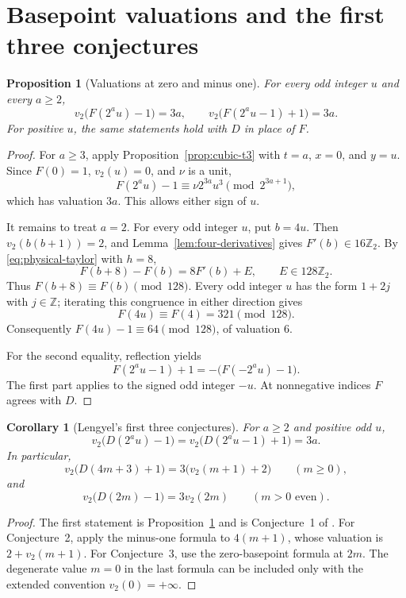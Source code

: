 \documentclass[11pt]{article}
\newtheorem{proposition}[theorem]{Proposition}
\newtheorem{corollary}[theorem]{Corollary}
\theoremstyle{remark}\newtheorem{remark}[theorem]{Remark}
\newcommand{\Z}{\mathbb Z}\newcommand{\Q}{\mathbb Q}
\newcommand{\Ztwo}{\mathbb Z_2}\newcommand{\Qtwo}{\mathbb Q_2}
\begin{document}
\section{Basepoint valuations and the first three conjectures}\label{sec:basepoints}
\begin{proposition}[Valuations at zero and minus one]\label{prop:basepoints}
For every odd integer $u$ and every $a\ge2$,
\[
v_2\bigl(F(2^a u)-1\bigr)=3a,
\qquad
v_2\bigl(F(2^a u-1)+1\bigr)=3a.
\]
For positive $u$, the same statements hold with $D$ in place of $F$.
\end{proposition}
\begin{proof}
For $a\ge3$, apply Proposition~\ref{prop:cubic-t3} with $t=a$,
$x=0$, and $y=u$. Since $F(0)=1$, $v_2(u)=0$, and $\nu$ is a unit,
\[
F(2^a u)-1\equiv\nu2^{3a}u^3\pmod{2^{3a+1}},
\]
which has valuation $3a$. This allows either sign of $u$.

It remains to treat $a=2$. For every odd integer $u$, put $b=4u$.
Then $v_2(b(b+1))=2$, and Lemma~\ref{lem:four-derivatives} gives
$F'(b)\in16\Ztwo$. By \eqref{eq:physical-taylor} with $h=8$,
\[
F(b+8)-F(b)=8F'(b)+E,\qquad E\in128\Ztwo.
\]
Thus $F(b+8)\equiv F(b)\pmod{128}$. Every odd integer $u$ has
the form $1+2j$ with $j\in\Z$; iterating this congruence in either
direction gives
\[
F(4u)\equiv F(4)=321\pmod{128}.
\]
Consequently $F(4u)-1\equiv64\pmod{128}$, of valuation $6$.

For the second equality, reflection yields
\[
F(2^a u-1)+1=-\bigl(F(-2^a u)-1\bigr).
\]
The first part applies to the signed odd integer $-u$.
At nonnegative indices $F$ agrees with $D$.
\end{proof}

\begin{corollary}[Lengyel's first three conjectures]\label{cor:c123}
For $a\ge2$ and positive odd $u$,
\[
v_2\bigl(D(2^a u)-1\bigr)
=v_2\bigl(D(2^a u-1)+1\bigr)=3a.
\]
In particular,
\[
v_2\bigl(D(4m+3)+1\bigr)=3\bigl(v_2(m+1)+2\bigr)
\qquad(m\ge0),
\]
and
\[
v_2\bigl(D(2m)-1\bigr)=3v_2(2m)
\qquad(m>0\text{ even}).
\]
\end{corollary}
\begin{proof}
The first statement is Proposition~\ref{prop:basepoints} and is
Conjecture~1 of \cite{Lengyel2021}. For Conjecture~2, apply the
minus-one formula to $4(m+1)$, whose valuation is $2+v_2(m+1)$.
For Conjecture~3, use the zero-basepoint formula at $2m$.
The degenerate value $m=0$ in the last formula can be included only
with the extended convention $v_2(0)=+\infty$.
\end{proof}
\end{document}
